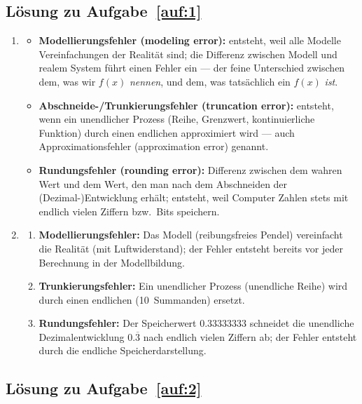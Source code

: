 \documentclass[a4paper,11pt]{scrartcl}
\begin{document}
\subsection*{Lösung zu Aufgabe~\ref{auf:1}}

\begin{enumerate}[label=(\alph*)]
  \item
  \begin{itemize}
    \item \textbf{Modellierungsfehler (modeling error):} entsteht, weil alle Modelle Vereinfachungen der Realität sind; die Differenz zwischen Modell und realem System führt einen Fehler ein --- der feine Unterschied zwischen dem, was wir $f(x)$ \emph{nennen}, und dem, was tatsächlich ein $f(x)$ \emph{ist}.
    \item \textbf{Abschneide-/Trunkierungsfehler (truncation error):} entsteht, wenn ein unendlicher Prozess (Reihe, Grenzwert, kontinuierliche Funktion) durch einen endlichen approximiert wird --- auch Approximationsfehler (approximation error) genannt.
    \item \textbf{Rundungsfehler (rounding error):} Differenz zwischen dem wahren Wert und dem Wert, den man nach dem Abschneiden der (Dezimal-)Entwicklung erhält; entsteht, weil Computer Zahlen stets mit endlich vielen Ziffern bzw.\ Bits speichern.
  \end{itemize}
  \item
  \begin{enumerate}[label=(\roman*)]
    \item \textbf{Modellierungsfehler:} Das Modell (reibungsfreies Pendel) vereinfacht die Realität (mit Luftwiderstand); der Fehler entsteht bereits vor jeder Berechnung in der Modellbildung.
    \item \textbf{Trunkierungsfehler:} Ein unendlicher Prozess (unendliche Reihe) wird durch einen endlichen (10~Summanden) ersetzt.
    \item \textbf{Rundungsfehler:} Der Speicherwert $0.33333333$ schneidet die unendliche Dezimalentwicklung $0.\overline{3}$ nach endlich vielen Ziffern ab; der Fehler entsteht durch die endliche Speicherdarstellung.
  \end{enumerate}
\end{enumerate}

\subsection*{Lösung zu Aufgabe~\ref{auf:2}}
\end{document}
